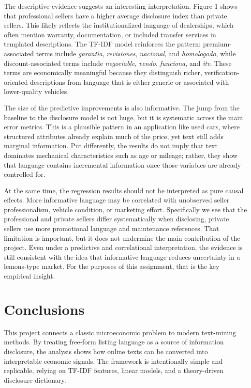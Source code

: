 \documentclass[10pt,twocolumn]{article}
\begin{document}
The descriptive evidence suggests an interesting interpretation. Figure 1 shows that professional sellers have a higher average disclosure index than private sellers. This likely reflects the institutionalized language of dealerships, which often mention warranty, documentation, or included transfer services in templated descriptions. The TF-IDF model reinforces the pattern: premium-associated terms include \textit{garant\'{\i}a}, \textit{revisiones}, \textit{nacional}, and \textit{homologado}, while discount-associated terms include \textit{negociable}, \textit{vendo}, \textit{funciona}, and \textit{itv}. These terms are economically meaningful because they distinguish richer, verification-oriented descriptions from language that is either generic or associated with lower-quality vehicles.

The size of the predictive improvements is also informative. The jump from the baseline to the disclosure model is not huge, but it is systematic across the main error metrics. This is a plausible pattern in an application like used cars, where structured attributes already explain much of the price, yet text still adds marginal information. Put differently, the results do not imply that text dominates mechanical characteristics such as age or mileage; rather, they show that language contains incremental information once those variables are already controlled for.

At the same time, the regression results should not be interpreted as pure causal effects. More informative language may be correlated with unobserved seller professionalism, vehicle condition, or marketing effort. Specifically we see that the professional and private sellers differ systematically when disclosing, private sellers use more promotional language and maintenance references.  That limitation is important, but it does not undermine the main contribution of the project. Even under a predictive and correlational interpretation, the evidence is still consistent with the idea that informative language reduces uncertainty in a lemons-type market. For the purposes of this assignment, that is the key empirical insight.



\section{Conclusions}
This project connects a classic microeconomic problem to modern text-mining methods. By treating free-form listing language as a source of information disclosure, the analysis shows how online texts can be converted into interpretable economic signals. The framework is intentionally simple and replicable, relying on TF-IDF features, linear models, and a theory-driven disclosure dictionary.
\end{document}
